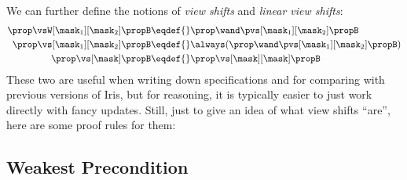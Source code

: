 We can further define the notions of \emph{view shifts} and \emph{linear view shifts}:
\begin{align*}
  \prop \vsW[\mask_1][\mask_2] \propB \eqdef{}& \prop \wand \pvs[\mask_1][\mask_2] \propB \\
  \prop \vs[\mask_1][\mask_2] \propB \eqdef{}& \always(\prop \wand \pvs[\mask_1][\mask_2] \propB) \\
  \prop \vs[\mask] \propB \eqdef{}& \prop \vs[\mask][\mask] \propB
\end{align*}
These two are useful when writing down specifications and for comparing with previous versions of Iris, but for reasoning, it is typically easier to just work directly with fancy updates.
Still, just to give an idea of what view shifts ``are'', here are some proof rules for them:

\subsection{Weakest Precondition}

